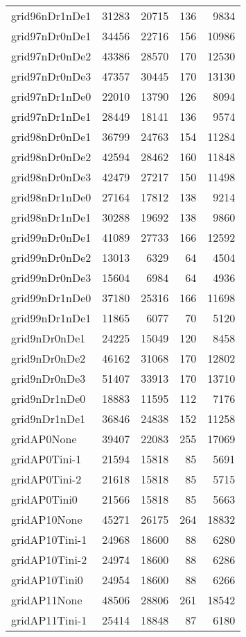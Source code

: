 \begin{longtable}{lrrrr}
grid96nDr1nDe1 & 31283 & 20715 & 136 & 9834 \\
grid97nDr0nDe1 & 34456 & 22716 & 156 & 10986 \\
grid97nDr0nDe2 & 43386 & 28570 & 170 & 12530 \\
grid97nDr0nDe3 & 47357 & 30445 & 170 & 13130 \\
grid97nDr1nDe0 & 22010 & 13790 & 126 & 8094 \\
grid97nDr1nDe1 & 28449 & 18141 & 136 & 9574 \\
grid98nDr0nDe1 & 36799 & 24763 & 154 & 11284 \\
grid98nDr0nDe2 & 42594 & 28462 & 160 & 11848 \\
grid98nDr0nDe3 & 42479 & 27217 & 150 & 11498 \\
grid98nDr1nDe0 & 27164 & 17812 & 138 & 9214 \\
grid98nDr1nDe1 & 30288 & 19692 & 138 & 9860 \\
grid99nDr0nDe1 & 41089 & 27733 & 166 & 12592 \\
grid99nDr0nDe2 & 13013 & 6329 & 64 & 4504 \\
grid99nDr0nDe3 & 15604 & 6984 & 64 & 4936 \\
grid99nDr1nDe0 & 37180 & 25316 & 166 & 11698 \\
grid99nDr1nDe1 & 11865 & 6077 & 70 & 5120 \\
grid9nDr0nDe1 & 24225 & 15049 & 120 & 8458 \\
grid9nDr0nDe2 & 46162 & 31068 & 170 & 12802 \\
grid9nDr0nDe3 & 51407 & 33913 & 170 & 13710 \\
grid9nDr1nDe0 & 18883 & 11595 & 112 & 7176 \\
grid9nDr1nDe1 & 36846 & 24838 & 152 & 11258 \\
gridAP0None & 39407 & 22083 & 255 & 17069 \\
gridAP0Tini-1 & 21594 & 15818 & 85 & 5691 \\
gridAP0Tini-2 & 21618 & 15818 & 85 & 5715 \\
gridAP0Tini0 & 21566 & 15818 & 85 & 5663 \\
gridAP10None & 45271 & 26175 & 264 & 18832 \\
gridAP10Tini-1 & 24968 & 18600 & 88 & 6280 \\
gridAP10Tini-2 & 24974 & 18600 & 88 & 6286 \\
gridAP10Tini0 & 24954 & 18600 & 88 & 6266 \\
gridAP11None & 48506 & 28806 & 261 & 18542 \\
gridAP11Tini-1 & 25414 & 18848 & 87 & 6180 \\

\end{longtable}
